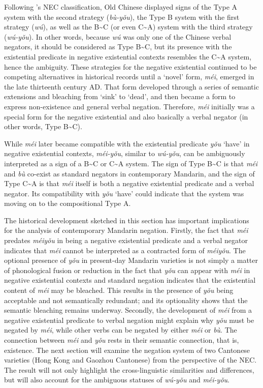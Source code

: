 \documentclass[output=paper]{langscibook}
\begin{document}
Following \citeauthor{Croft1991}'s NEC classification, Old Chinese displayed signs of the Type A system with the second strategy (\textit{bù-yǒu}), the Type B system with the first strategy (\textit{wú}), as well as the B\sim C (or even C\sim A) system with the third strategy (\textit{wú-yǒu}). In other words, because \textit{wú} was only one of the Chinese verbal negators, it should be considered as Type B\sim C, but its presence with the existential predicate in negative existential contexts resembles the C\sim A system, hence the ambiguity. These strategies for the negative existential continued to be competing alternatives in historical records until a `novel' form, \textit{méi}, emerged in the late thirteenth century AD. That form developed through a series of semantic extensions and bleaching from `sink' to `dead', and then became a form to express non-existence and general verbal negation. Therefore, \textit{méi} initially was a special form for the negative existential and also basically a verbal negator (in other words, Type B\sim C). 

While \textit{méi} later became compatible with the existential predicate \textit{yǒu} `have' in negative existential contexts, \textit{méi-yǒu}, similar to \textit{wú-yǒu}, can be ambiguously interpreted as a sign of a B\sim C or C\sim A system. The sign of Type B\sim C is that \textit{méi} and \textit{bù} co-exist as standard negators in contemporary Mandarin, and the sign of Type C\sim A is that \textit{méi} itself is both a negative existential predicate and a verbal negator. Its compatibility with \textit{yǒu} `have' could indicate that the system was moving on to the compositional Type A.

The historical development sketched in this section has important implications for the analysis of contemporary Mandarin negation. Firstly, the fact that \textit{méi} predates \textit{méiyǒu} in being a negative existential predicate and a verbal negator indicates that \textit{méi} cannot be interpreted as a contracted form of \textit{méiyǒu}. The optional presence of \textit{yǒu} in present-day Mandarin varieties is not simply a matter of phonological fusion or reduction in the fact that \textit{yǒu} can appear with \textit{méi} in negative existential contexts and standard negation indicates that the existential content of \textit{méi} may be bleached. This results in the presence of \textit{yǒu} being acceptable and not semantically redundant; and its optionality shows that the semantic bleaching remains underway. Secondly, the development of \textit{méi} from a negative existential predicate to verbal negation might explain why \textit{yǒu} must be negated by \textit{méi}, while other verbs can be negated by either \textit{méi} or \textit{bù}. The connection between \textit{méi} and \textit{yǒu} rests in their semantic connection, that is, existence. The next section will examine the negation system of two Cantonese varieties (Hong Kong and Gaozhou Cantonese) from the perspective of the NEC. The result will not only highlight the cross-linguistic similarities and differences, but will also account for the ambiguous statuses of \textit{wú-yǒu} and \textit{méi-yǒu}. 
\end{document}
